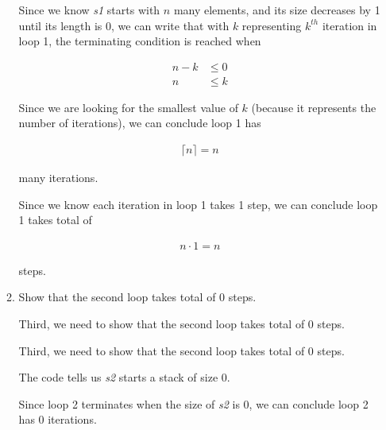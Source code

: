 \documentclass[12pt]{article}
\begin{document}
\begin{enumerate}[a.]
\begin{mdframed}
\begin{enumerate}[1.]
\begin{mdframed}
            \bigskip

            Since we know \textit{s1} starts with $n$ many elements, and its size decreases
            by 1 until its length is 0, we can write that with $k$ representing
            $k^{th}$ iteration in loop 1, the terminating condition is reached when

            \begin{align}
                n - k &\leq 0\\
                n &\leq k
            \end{align}

            \bigskip

            Since we are looking for the smallest value of $k$ (because it represents
            the number of iterations), we can conclude loop 1 has

            \begin{align}
                \lceil n \rceil = n
            \end{align}

            many iterations.

            \bigskip

            Since we know each iteration in loop 1 takes 1 step, we can conclude
            loop 1 takes total of

            \begin{align}
                n \cdot 1 = n
            \end{align}

            steps.

            \end{mdframed}

            \item Show that the second loop takes total of 0 steps.

            \bigskip

            Third, we need to show that the second loop takes total of 0 steps.

            \bigskip

            \begin{mdframed}
            Third, we need to show that the second loop takes total of 0 steps.

            \bigskip

            The code tells us \textit{s2} starts a stack of size 0.

            \bigskip

            Since loop 2 terminates when the size of \textit{s2} is 0,
            we can conclude loop 2 has 0 iterations.


\end{mdframed}
\end{enumerate}
\end{mdframed}
\end{enumerate}
\end{document}
